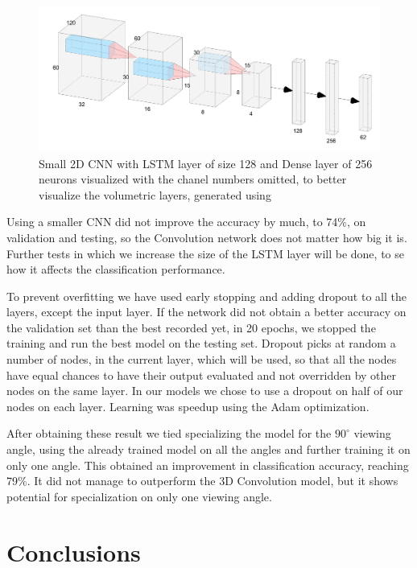 \documentclass[12pt]{article}
\theoremstyle{definition}
\begin{document}
	\begin{figure}
		\includegraphics[width=\textwidth]{networks/small-2D-CNN-LSTM-Dense.png}
		\caption{Small 2D CNN with LSTM layer of size 128 and Dense layer of 256 neurons visualized with the chanel numbers omitted, to better visualize the volumetric layers, generated using \cite{nn-svg}}
		\label{figure:small-2D-CNN-LSTM-Dense}
	\end{figure}

	Using a smaller CNN did not improve the accuracy by much, to 74\%, on validation and testing, so the Convolution network does not matter how big it is. Further tests in which we increase the size of the LSTM layer will be done, to se how it affects the classification performance.

	To prevent overfitting we have used early stopping and adding dropout to all the layers, except the input layer. If the network did not obtain a better accuracy on the validation set than the best recorded yet, in 20 epochs, we stopped the training and run the best model on the testing set. Dropout picks at random a number of nodes, in the current layer, which will be used, so that all the nodes have equal chances to have their output evaluated and not overridden by other nodes on the same layer. In our models we chose to use a dropout on half of our nodes on each layer. Learning was speedup using the Adam optimization.

	After obtaining these result we tied specializing the model for the $90^\circ$ viewing angle, using the already trained model on all the angles and further training it on only one angle. This obtained an improvement in classification accuracy, reaching 79\%. It did not manage to outperform the 3D Convolution model, but it shows potential for specialization on only one viewing angle.

	\clearpage

	\section{Conclusions}
	\vspace{1cm}
\end{document}
